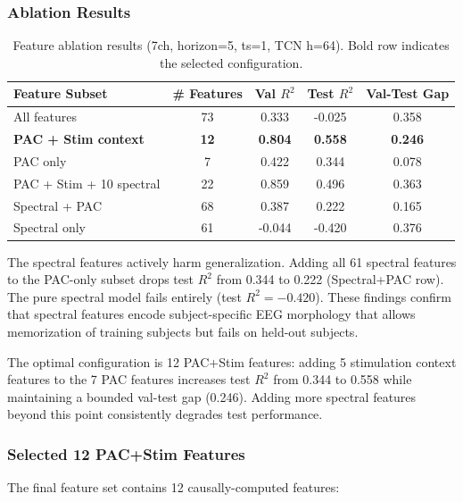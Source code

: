 \documentclass[11pt,letterpaper]{article}
\begin{document}
\subsubsection{Ablation Results}

\begin{table}[htbp]
\centering
\caption{Feature ablation results (7ch, horizon=5, ts=1, TCN h=64). Bold row indicates the selected configuration.}
\label{tab:feature_ablation}
\small
\begin{tabular}{lcccc}
\toprule
\textbf{Feature Subset} & \textbf{\# Features} & \textbf{Val $R^2$} & \textbf{Test $R^2$} & \textbf{Val-Test Gap} \\
\midrule
All features & 73 & 0.333 & -0.025 & 0.358 \\
\textbf{PAC + Stim context} & \textbf{12} & \textbf{0.804} & \textbf{0.558} & \textbf{0.246} \\
PAC only & 7 & 0.422 & 0.344 & 0.078 \\
PAC + Stim + 10 spectral & 22 & 0.859 & 0.496 & 0.363 \\
Spectral + PAC & 68 & 0.387 & 0.222 & 0.165 \\
Spectral only & 61 & -0.044 & -0.420 & 0.376 \\
\bottomrule
\end{tabular}
\end{table}

The spectral features actively harm generalization. Adding all 61 spectral features to the PAC-only subset drops test $R^2$ from 0.344 to 0.222 (Spectral+PAC row). The pure spectral model fails entirely (test $R^2 = -0.420$). These findings confirm that spectral features encode subject-specific EEG morphology that allows memorization of training subjects but fails on held-out subjects.

The optimal configuration is 12 PAC+Stim features: adding 5 stimulation context features to the 7 PAC features increases test $R^2$ from 0.344 to 0.558 while maintaining a bounded val-test gap (0.246). Adding more spectral features beyond this point consistently degrades test performance.

\subsubsection{Selected 12 PAC+Stim Features}

The final feature set contains 12 causally-computed features:
\end{document}
